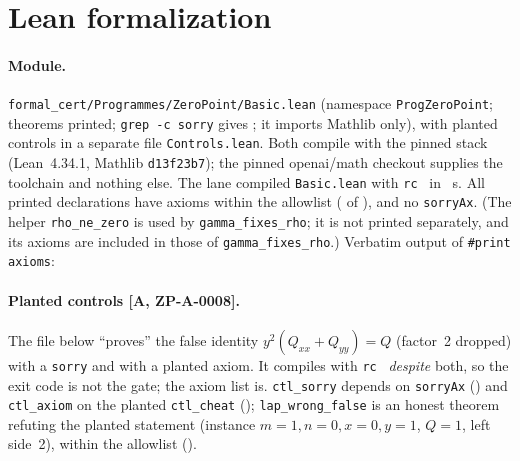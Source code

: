 \documentclass[10pt]{article}
\newcommand{\tier}[1]{\textsf{[#1]}}
\newcommand{\lean}[1]{\texttt{#1}}
\begin{document}
\section{Lean formalization}\label{sec:lean}
\paragraph{Module.} \texttt{formal\_cert/Programmes/ZeroPoint/Basic.lean} (namespace \lean{ProgZeroPoint}; \ZPLeanNThm{} theorems printed;
\texttt{grep -c sorry} gives \ZPLeanSorryCount; it imports Mathlib only), with planted controls in a separate file
\texttt{Controls.lean}. Both compile with the pinned stack (Lean~4.34.1, Mathlib \texttt{d13f23b7}); the pinned openai/math checkout supplies the toolchain and nothing else. The lane compiled
\texttt{Basic.lean} with \texttt{rc}~\ZPLeanRc{} in \ZPLeanSecs~s. All \ZPLeanNThm{} printed declarations have axioms within the allowlist (\ZPLeanNInAllow{} of \ZPLeanNThm), and no \lean{sorryAx}.
(The helper \lean{rho\_ne\_zero} is used by \lean{gamma\_fixes\_rho}; it is not printed separately, and its axioms are included in those of \lean{gamma\_fixes\_rho}.)
Verbatim output of \lean{\#print axioms}:

\paragraph{Planted controls \tier{A, ZP-A-0008}.} The file below ``proves'' the false identity $y^2(Q_{xx}+Q_{yy})=Q$ (factor~2 dropped) with a \lean{sorry} and with a planted axiom. It compiles with
\texttt{rc}~\ZPLeanRerunCtlRc{} \emph{despite} both, so the exit code is not the gate; the axiom list is. \lean{ctl\_sorry} depends on \lean{sorryAx} (\ZPLeanCtlSorryAx) and \lean{ctl\_axiom} on the planted \lean{ctl\_cheat}
(\ZPLeanCtlAxiom); \lean{lap\_wrong\_false} is an honest theorem refuting the planted statement (instance $m=1,n=0,x=0,y=1$, $Q=1$, left side~2), within the allowlist (\ZPLeanCtlWrongOk).


\end{document}
